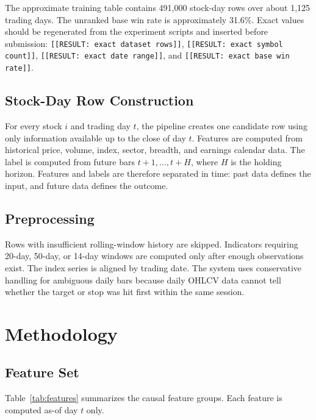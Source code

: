 \documentclass[11pt]{article}
\begin{document}
The approximate training table contains 491,000 stock-day rows over about 1,125
trading days. The unranked base win rate is approximately 31.6\%. Exact values
should be regenerated from the experiment scripts and inserted before
submission:
\texttt{[[RESULT: exact dataset rows]]},
\texttt{[[RESULT: exact symbol count]]},
\texttt{[[RESULT: exact date range]]}, and
\texttt{[[RESULT: exact base win rate]]}.

\subsection{Stock-Day Row Construction}

For every stock $i$ and trading day $t$, the pipeline creates one candidate row
using only information available up to the close of day $t$. Features are
computed from historical price, volume, index, sector, breadth, and earnings
calendar data. The label is computed from future bars $t+1,\ldots,t+H$, where
$H$ is the holding horizon. Features and labels are therefore separated in time:
past data defines the input, and future data defines the outcome.

\subsection{Preprocessing}

Rows with insufficient rolling-window history are skipped. Indicators requiring
20-day, 50-day, or 14-day windows are computed only after enough observations
exist. The index series is aligned by trading date. The system uses conservative
handling for ambiguous daily bars because daily OHLCV data cannot tell whether
the target or stop was hit first within the same session.

\section{Methodology}

\subsection{Feature Set}

Table~\ref{tab:features} summarizes the causal feature groups. Each feature is
computed as-of day $t$ only.
\end{document}
